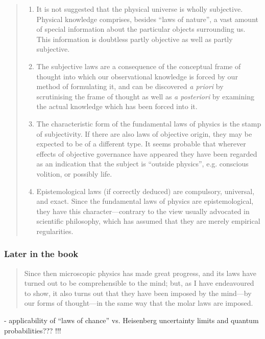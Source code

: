 \documentclass{article}
\begin{document}
\begin{quote}
\begin{enumerate}
        \item It is not suggested that the physical universe is wholly subjective.  Physical knowledge comprises, besides ``laws of nature'', a vast amount of special information about the particular objects surrounding us.  This information is doubtless partly objective as well as partly subjective.
        \item The subjective laws are a consequence of the conceptual frame of thought into which our observational knowledge is forced by our method of formulating it, and can be discovered \emph{a priori} by scrutinising the frame of thought as well as \emph{a posteriori} by examining the actual knowledge which has been forced into it.
        \item The characteristic form of the fundamental laws of physics is the stamp of subjectivity.  If there are also laws of objective origin, they may be expected to be of a different type.  It seems probable that wherever effects of objective governance have appeared they have been regarded as an indication that the subject is ``outside physics'', e.g. conscious volition, or possibly life.
        \item Epistemological laws (if correctly deduced) are compulsory, universal, and exact.  Since the fundamental laws of physics are epistemological, they have this character---contrary to the view usually advocated in scientific philosophy, which has assumed that they are merely empirical regularities.\citep[p. 102-105]{Eddington1939}
    \end{enumerate}
\end{quote}

\subsubsection{Later in the book}

\begin{quote}
    Since then microscopic physics has made great progress, and its laws have turned out to be comprehensible to the mind; but, as I have endeavoured to show, it also turns out that they have been imposed by the mind---by our forms of thought---in the same way that the molar laws are imposed. \citep[p. 180]{Eddington1939}
\end{quote}



- applicability of ``laws of chance'' vs. Heisenberg uncertainty limits and quantum probabilities??? !!!
\end{document}
